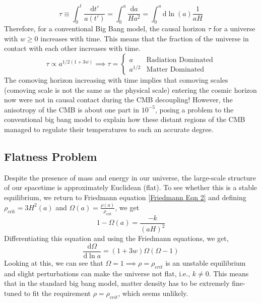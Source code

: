 \documentclass[aps,prd,reprint,preprintnumbers,showpacs,floatfix,nofootinbib,superscript address]{revtex4-2}
\begin{document}
\begin{equation}    \label{6}
    \tau \equiv \int_{0}^{t} \frac{\mathrm{d} t'}{a(t')} = \int_{0}^{a} \frac{\mathrm{d}a}{H a^2} = \int_{0}^{a} \mathrm{d} \ln(a) \frac{1}{aH}
\end{equation}
Therefore, for a conventional Big Bang model, the causal horizon $\tau$ for a universe with $w \geq 0$ increases with time. This means that the fraction of the universe in contact with each other increases with time.
\begin{equation}
    \tau \propto a^{1/2(1+3w)} \implies \tau = \begin{cases}
        a & \text{Radiation Dominated} \\
        a^{1/2} & \text{Matter Dominated}
    \end{cases}
\end{equation}
The comoving horizon increasing with time implies that comoving scales (comoving scale is not the same as the physical scale) entering the cosmic horizon now were not in causal contact during the CMB decoupling! However, the anisotropy of the CMB is about one part in $10^{-5}$, posing a problem to the conventional big bang model to explain how these distant regions of the CMB managed to regulate their temperatures to such an accurate degree.

\subsection{Flatness Problem} \label{Flatness Problem}
Despite the presence of mass and energy in our universe, the large-scale structure of our spacetime is approximately Euclidean (flat). To see whether this is a stable equilibrium, we return to Friedmann equation \cref{Friedmann Eqn 2} and defining $\rho_{\text{crit}} = 3H^2(a)$ and $\Omega(a) = \frac{\rho(a)}{\rho_{\text{crit}}}$, we get
\begin{equation}
    1 - \Omega(a) = \frac{-k}{(aH)^2}
\end{equation}
Differentiating this equation and using the Friedmann equations, we get,
\begin{equation}
    \frac{\mathrm{d}\Omega}{\mathrm{d} \ln a} = (1+3w)\Omega(\Omega-1)
\end{equation}
Looking at this, we can see that $\Omega = 1  \implies \rho = \rho_{crit}$ is an unstable equilibrium and slight perturbations can make the universe not flat, i.e., $k \neq 0$. This means that in the standard big bang model, matter density has to be extremely fine-tuned to fit the requirement $\rho = \rho_{crit}$, which seems unlikely.
\end{document}
